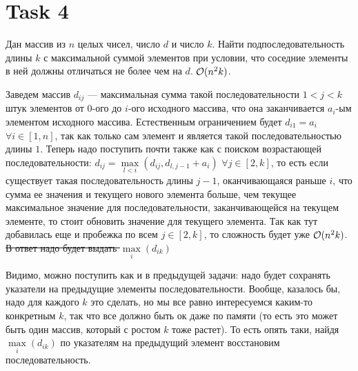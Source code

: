 \section{Task 4}
\begin{task}
    Дан массив из $n$ целых чисел, число $d$ и число $k$. Найти подпоследовательность длины $k$ с максимальной суммой элементов при условии, что соседние элементы в ней должны отличаться не более чем на $d$. $\mathcal{O}(n^2k)$.
\end{task}

\begin{solution}
    Заведем массив $d_{ij}$ --- максимальная сумма такой последовательности $1<j<k$ штук элементов от $0$-ого до $i$-ого исходного массива, что она заканчивается $a_i$-ым элементом исходного массива.
    Естественным ограничением будет $d_{i1} = a_i$ $\forall i \in [1, n]$, так как только сам элемент и является такой последовательностью длины $1$.
    Теперь надо поступить почти также как с поиском возрастающей последовательности:
    $d_{ij} = \max\limits_{l<i}(d_{ij}, d_{l,j-1} + a_i)$ $\forall j \in [2, k]$, то есть если существует такая последовательность длины $j-1$, оканчивающаяся раньше $i$, что сумма ее значения и текущего нового элемента больше, чем текущее максимальное значение для последовательности, заканчивающейся на текущем элементе, то стоит обновить значение для текущего элемента. Так как тут добавилась еще и пробежка по всем $j \in [2, k]$, то сложность будет уже $\mathcal{O}(n^2k)$.
    \sout{В ответ надо будет выдать $\max\limits_i(d_{ik})$}
    \begin{upd}
        Видимо, можно поступить как и в предыдущей задачи: надо будет сохранять указатели на предыдущие элементы последовательности. Вообще, казалось бы, надо для каждого $k$ это сделать, но мы все равно интересуемся каким-то конкретным $k$, так что все должно быть ок даже по памяти (то есть это может быть один массив, который с ростом $k$ тоже растет). То есть опять таки, найдя $\max\limits_i(d_{ik})$ по указателям на предыдущий элемент восстановим последовательность.
    \end{upd}
\end{solution}